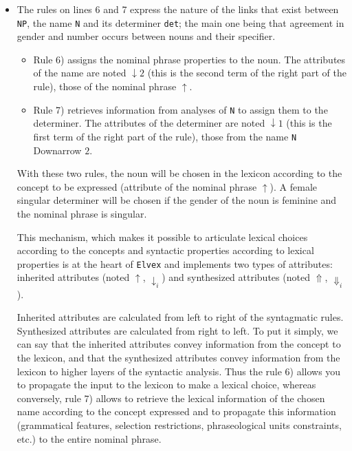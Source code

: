 \documentclass[11pt]{article}
\begin{document}
\begin{itemize}
\item The rules on lines 6 and 7 express the nature of the links that
  exist between \texttt{NP}, the name \texttt{N} and its determiner
  \texttt{det}; the main one being that agreement in gender and number
  occurs between nouns and their specifier.

  \begin{itemize}
  \item Rule 6) assigns the nominal phrase properties to the noun. The
    attributes of the name are noted $\downarrow2$ (this is the second
    term of the right part of the rule), those of the nominal phrase
    $\uparrow$.

  \item Rule 7) retrieves information from analyses of \texttt{N} to
    assign them to the determiner.  The attributes of the determiner
    are noted $\downarrow1$ (this is the first term of the right part
    of the rule), those from the name \texttt{N} Downarrow $2$.

  \end{itemize}
  
  With these two rules, the noun will be chosen in the lexicon
  according to the concept to be expressed (attribute of the nominal
  phrase $\uparrow$).  A female singular determiner will be chosen if
  the gender of the noun is feminine and the nominal phrase is
  singular.
  
  This mechanism, which makes it possible to articulate lexical
  choices according to the concepts and syntactic properties according
  to lexical properties is at the heart of \texttt{Elvex} and
  implements two types of attributes: inherited attributes (noted
  $\uparrow$, $\downarrow_i$) and synthesized attributes (noted
  $\Uparrow$, $\Downarrow_i$).
  
  Inherited attributes are calculated from left to right of the
  syntagmatic rules. Synthesized attributes are calculated from right
  to left. To put it simply, we can say that the inherited attributes
  convey information from the concept to the lexicon, and that the
  synthesized attributes convey information from the lexicon to higher
  layers of the syntactic analysis. Thus the rule 6) allows you to
  propagate the input to the lexicon to make a lexical choice, whereas
  conversely, rule 7) allows to retrieve the lexical information of
  the chosen name according to the concept expressed and to propagate
  this information (grammatical features, selection restrictions,
  phraseological units constraints, etc.)  to the entire nominal
  phrase.
  

\end{itemize}
\end{document}
